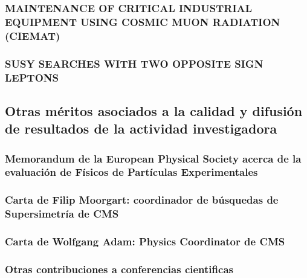 \documentclass[a4paper, 11pt, twoside, openright]{report}
\begin{document}
\subsubsection{MAINTENANCE OF CRITICAL INDUSTRIAL EQUIPMENT USING COSMIC MUON RADIATION (CIEMAT)}


\subsubsection{SUSY SEARCHES WITH TWO OPPOSITE SIGN LEPTONS}




\subsection{Otras méritos asociados a la calidad y difusión de resultados de la actividad investigadora}

\subsubsection{Memorandum de la European Physical Society acerca de la evaluación de Físicos de Partículas Experimentales}


\subsubsection{Carta de Filip Moorgart: coordinador de búsquedas de Supersimetría de CMS}


\subsubsection{Carta de Wolfgang Adam: Physics Coordinator de CMS}



\subsubsection{Otras contribuciones a conferencias cientificas}
\end{document}

